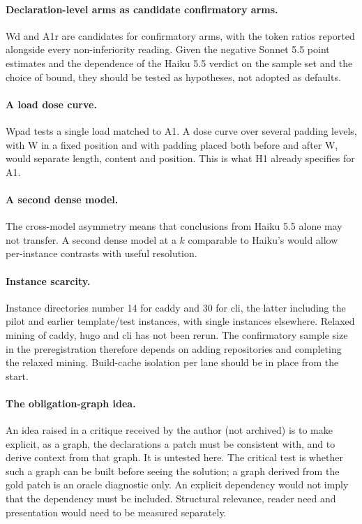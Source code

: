 \paragraph{Declaration-level arms as candidate confirmatory arms.} Wd and A1r are candidates for confirmatory arms, with the token ratios reported alongside every non-inferiority reading. Given the negative Sonnet 5.5 point estimates and the dependence of the Haiku 5.5 verdict on the sample set and the choice of bound, they should be tested as hypotheses, not adopted as defaults.

\paragraph{A load dose curve.} Wpad tests a single load matched to A1. A dose curve over several padding levels, with W in a fixed position and with padding placed both before and after W, would separate length, content and position. This is what H1 already specifies for A1.

\paragraph{A second dense model.} The cross-model asymmetry means that conclusions from Haiku 5.5 alone may not transfer. A second dense model at a $k$ comparable to Haiku's would allow per-instance contrasts with useful resolution.

\paragraph{Instance scarcity.} Instance directories number 14 for caddy and 30 for cli, the latter including the pilot and earlier template/test instances, with single instances elsewhere. Relaxed mining of caddy, hugo and cli has not been rerun. The confirmatory sample size in the preregistration therefore depends on adding repositories and completing the relaxed mining. Build-cache isolation per lane should be in place from the start.

\paragraph{The obligation-graph idea.} An idea raised in a critique received by the author (not archived) is to make explicit, as a graph, the declarations a patch must be consistent with, and to derive context from that graph. It is untested here. The critical test is whether such a graph can be built before seeing the solution; a graph derived from the gold patch is an oracle diagnostic only. An explicit dependency would not imply that the dependency must be included. Structural relevance, reader need and presentation would need to be measured separately.

